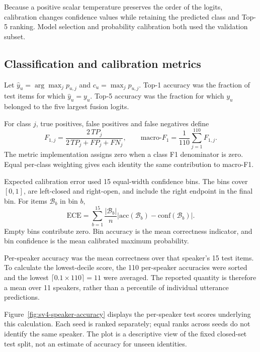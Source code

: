 Because a positive scalar temperature preserves the order of the logits, calibration changes confidence values while retaining the predicted class and Top-5 ranking. Model selection and probability calibration both used the validation subset.

\subsection{Classification and calibration metrics}
Let $\hat y_u=\arg\max_jp_{u,j}$ and $c_u=\max_jp_{u,j}$. Top-1 accuracy was the fraction of test items for which $\hat y_u=y_u$. Top-5 accuracy was the fraction for which $y_u$ belonged to the five largest fusion logits.

For class $j$, true positives, false positives and false negatives define
\begin{equation}
 F_{1,j}=\frac{2\,TP_j}{2\,TP_j+FP_j+FN_j},
 \qquad
 \mathrm{macro}\mbox{-}F_1=\frac{1}{110}\sum_{j=1}^{110}F_{1,j}.
 \label{eq:sv2-f1}
\end{equation}
The metric implementation assigns zero when a class F1 denominator is zero. Equal per-class weighting gives each identity the same contribution to macro-F1.

Expected calibration error used 15 equal-width confidence bins. The bins cover $[0,1]$, are left-closed and right-open, and include the right endpoint in the final bin. For items $\mathcal B_b$ in bin $b$,
\begin{equation}
 \mathrm{ECE}
 =\sum_{b=1}^{15}\frac{|\mathcal B_b|}{n}
       \left|\mathrm{acc}(\mathcal B_b)
             -\mathrm{conf}(\mathcal B_b)\right|.
 \label{eq:sv2-ece}
\end{equation}
Empty bins contribute zero. Bin accuracy is the mean correctness indicator, and bin confidence is the mean calibrated maximum probability.

Per-speaker accuracy was the mean correctness over that speaker's 15 test items. To calculate the lowest-decile score, the 110 per-speaker accuracies were sorted and the lowest $\lceil0.1\times110\rceil=11$ were averaged. The reported quantity is therefore a mean over 11 speakers, rather than a percentile of individual utterance predictions.

Figure~\ref{fig:sv4-speaker-accuracy} displays the per-speaker test scores underlying this calculation. Each seed is ranked separately; equal ranks across seeds do not identify the same speaker. The plot is a descriptive view of the fixed closed-set test split, not an estimate of accuracy for unseen identities.

